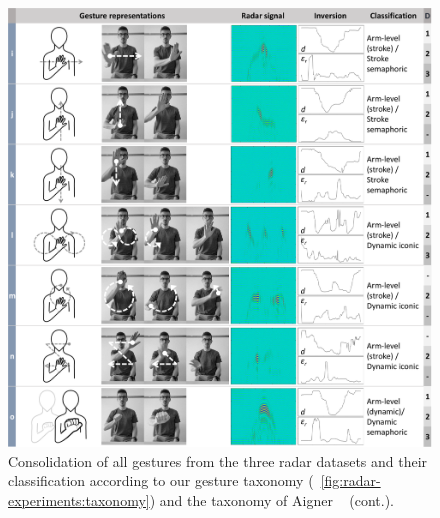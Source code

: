 \begin{figure}
    \centering
    \includegraphics[width=\linewidth]{Figures/RadarExperiments/Datasets/gesture-table-new-2.pdf}
    \caption{Consolidation of all gestures from the three radar datasets and their classification according to our gesture taxonomy (\fig~\ref{fig:radar-experiments:taxonomy}) and the taxonomy of Aigner \etal~\cite{Aigner:2012} (cont.).}
    \label{fig:radar-experiments:gestures-b}
    \vspace{-8pt}
\end{figure}

